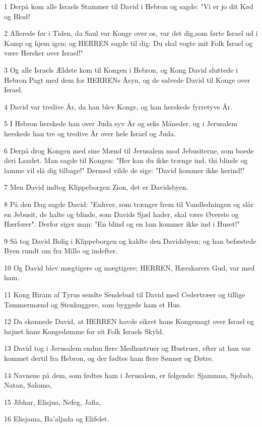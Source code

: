 \par 1 Derpå kom alle Israels Stammer til David i Hebron og sagde: "Vi er jo dit Kød og Blod!
\par 2 Allerede før i Tiden, da Saul var Konge over os, var det dig,som førte Israel ud i Kamp og hjem igen; og HERREN sagde til dig: Du skal vogte mit Folk Israel og være Hersker over Israel!"
\par 3 Og alle Israels Ældste kom til Kongen i Hebron, og Kong David sluttede i Hebron Pagt med dem for HERRENs Åsyn, og de salvede David til Konge over Israel.
\par 4 David var tredive År, da han blev Konge, og han herskede fyrretyve År.
\par 5 I Hebron herskede han over Juda syv År og seks Måneder, og i Jerusalem herskede han tre og tredive År over hele Israel og Juda.
\par 6 Derpå drog Kongen med sine Mænd til Jerusalem mod Jebusiterne, som boede deri Landet. Man sagde til Kongen: "Her kan du ikke trænge ind, thi blinde og lamme vil slå dig tilbage!" Dermed vilde de sige: "David kommer ikke herind!"
\par 7 Men David indtog Klippeborgen Zion, det er Davidsbyen.
\par 8 På den Dag sagde David: "Enhver, som trænger frem til Vandledningen og slår en Jebusit, de halte og blinde, som Davids Sjæl hader, skal være Øverste og Hærfører". Derfor siger man: "En blind og en lam kommer ikke ind i Huset!"
\par 9 Så tog David Bolig i Klippeborgen og kaldte den Davidsbyen; og han befæstede Byen rundt om fra Millo og indefter.
\par 10 Og David blev mægtigere og mægtigere; HERREN, Hærskarers Gud, var med ham.
\par 11 Kong Hiram af Tyrus sendte Sendebud til David med Cedertræer og tillige Tømmermænd og Stenhuggere, som byggede ham et Hus.
\par 12 Da skønnede David, at HERREN havde sikret hans Kongemagt over Israel og højnet hans Kongedømme for sit Folk Israels Skyld.
\par 13 David tog i Jerusalem endnu flere Medhustruer og Hustruer, efter at han var kommet dertil fra Hebron, og der fødtes ham flere Sønner og Døtre.
\par 14 Navnene på dem, som fødtes ham i Jerusalem, er følgende: Sjammua, Sjobab, Natan, Salomo,
\par 15 Jibhar, Elisjua, Nefeg, Jafia,
\par 16 Elisjama, Ba'aljada og Elifelet.
